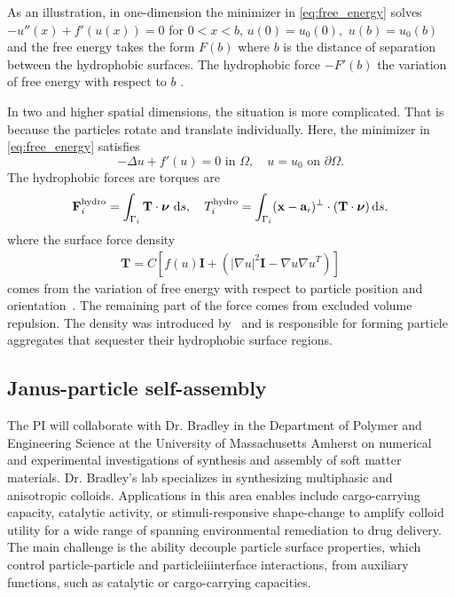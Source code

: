 As an illustration, in one-dimension the minimizer in
\eqref{eq:free_energy} solves $-u''(x) + f'(u(x)) = 0$ for $0 < x < b$,
$u(0) = u_0(0),$ $u(b) = u_0(b)$ and the free energy takes the form
$F(b)$ where $b$ is the  distance of separation between the hydrophobic
surfaces. The hydrophobic force $-F'(b)$ the variation of free energy
with respect to $b$  \cite{ErLjCl89, GoHaKo94}. 

In two and higher spatial dimensions, the situation is more complicated.
That is because the particles rotate and translate individually.
Here, the minimizer  in \eqref{eq:free_energy} satisfies 
\begin{equation}
\label{eq:SL}
-\Delta u + f'(u) = 0  \text{ in } \Omega,\quad u = u_0
\text{ on } \partial \Omega.
\end{equation}
The hydrophobic forces are torques are
\begin{equation}
  \label{eq:hydrophobicAttraction}
  \FF_i^{\text{hydro}} = \int_{\Gamma_i} {\bf T}\cdot \nnu \, \dif s, 
    \quad 
    T_i^{\text{hydro}} = \int_{\Gamma_i} (\xx - \aa_i)^{\perp} \cdot
    ({\bf T} \cdot \nnu) \dif s.
\end{equation}
where the surface force density 
\begin{align}
  \label{eq:stress}
\mathbf{T}
= C \left[ f(u) \mathbf{I} +  \left(|\nabla
  u|^2 \mathbf{I} - \nabla u  \nabla u^T\right)\right]
\end{align}
comes from the variation of free energy with respect to particle 
position and orientation~\cite{Bandle2015, Schiffer1954, Grinfeld2010}. 
The remaining part of the force comes from excluded volume repulsion. 
The density \label{eq:stress}  was introduced
by~\cite{Fu2018_SIAM} and is responsible for forming particle aggregates that
sequester their hydrophobic surface regions.

\subsection{Janus-particle self-assembly} 
The PI will collaborate with Dr. Bradley in the Department of 
Polymer and Engineering Science at the University of Massachusetts Amherst
on numerical and experimental investigations
of synthesis and assembly of soft matter materials.
Dr. Bradley's lab specializes in synthesizing multiphasic and anisotropic
colloids. Applications in this area enables include cargo-carrying capacity, 
catalytic activity, or stimuli-responsive shape-change to amplify colloid
utility for a wide range of  spanning environmental remediation to drug
delivery. The main challenge is the ability decouple particle surface properties, 
which control particle-particle and particleiiinterface interactions, 
from auxiliary functions, such as catalytic or cargo-carrying capacities.

